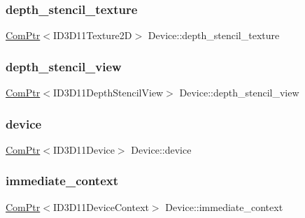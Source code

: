 \subsubsection{\texorpdfstring{depth\+\_\+stencil\+\_\+texture}{depth\_stencil\_texture}}
{\footnotesize\ttfamily \mbox{\hyperlink{common_8h_ab7d7d9064a34dd725663b1dbee652aca}{Com\+Ptr}}$<$I\+D3\+D11\+Texture2D$>$ Device\+::depth\+\_\+stencil\+\_\+texture}

\mbox{\label{class_device_ac76a2dc2c3c49bb40f82c6d5300bf2b8}} 
\subsubsection{\texorpdfstring{depth\+\_\+stencil\+\_\+view}{depth\_stencil\_view}}
{\footnotesize\ttfamily \mbox{\hyperlink{common_8h_ab7d7d9064a34dd725663b1dbee652aca}{Com\+Ptr}}$<$I\+D3\+D11\+Depth\+Stencil\+View$>$ Device\+::depth\+\_\+stencil\+\_\+view}

\mbox{\label{class_device_af0aeb4e2375287fe02fc5154015b53be}} 
\subsubsection{\texorpdfstring{device}{device}}
{\footnotesize\ttfamily \mbox{\hyperlink{common_8h_ab7d7d9064a34dd725663b1dbee652aca}{Com\+Ptr}}$<$I\+D3\+D11\+Device$>$ Device\+::device}

\mbox{\label{class_device_a445dfbc67c6d8ad039ee462a891d63fc}} 
\subsubsection{\texorpdfstring{immediate\+\_\+context}{immediate\_context}}
{\footnotesize\ttfamily \mbox{\hyperlink{common_8h_ab7d7d9064a34dd725663b1dbee652aca}{Com\+Ptr}}$<$I\+D3\+D11\+Device\+Context$>$ Device\+::immediate\+\_\+context}

\mbox{\label{class_device_ad50562d65b7c377ff48bf3ca26555028}} 

